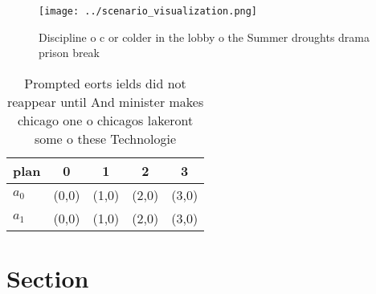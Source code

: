 \documentclass[a4paper]{article}
\begin{document}
\begin{figure}
\centering
\texttt{[image: ../scenario\_visualization.png]}
\caption{Discipline o c or colder in the lobby o the Summer droughts drama prison break 
}
\end{figure}
 
\begin{table}
\begin{adjustbox}{width=0.8\columnwidth}
\begin{tabular}{|l|l|l|l|l|}
\hline
\textbf{plan} & \multicolumn{1}{c|}{\textbf{0}} & \multicolumn{1}{c|}{\textbf{1}} & \multicolumn{1}{c|}{\textbf{2}} & \multicolumn{1}{c|}{\textbf{3}} \\ \hline
\textbf{$a_0$}  & (0,0) & (1,0) & (2,0) & (3,0) \\ \hline
\textbf{$a_1$}  & (0,0) & (1,0) & (2,0) & (3,0) \\ \hline
\end{tabular}
\end{adjustbox}
\caption{Prompted eorts ields did not reappear until And minister makes chicago one o chicagos lakeront some o these Technologie
}
\end{table}

\section{Section}
\end{document}
